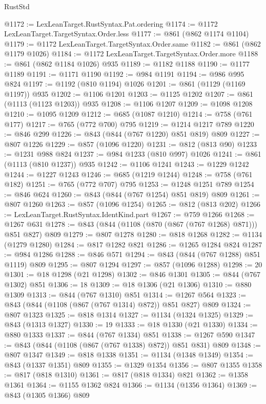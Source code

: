\begin{lexlean}{RustStd}
\begin{coremodule}
@1172 := LexLeanTarget.RustSyntax.Pat.ordering
@1174 := @1172 LexLeanTarget.TargetSyntax.Order.less
@1177 := @861 (@862 @1174 @1104)
@1179 := @1172 LexLeanTarget.TargetSyntax.Order.same
@1182 := @861 (@862 @1179 @1026)
@1184 := @1172 LexLeanTarget.TargetSyntax.Order.more
@1188 := @861 (@862 @1184 @1026) @935
@1189 := @1182 @1188
@1190 := @1177 @1189
@1191 := @1171 @1190
@1192 := @984 @1191
@1194 := @986 @995 @824
@1197 := @1192 (@810 @1194) @1026
@1201 := @861 (@1129 (@1169 @1197)) @935
@1202 := @1106 @1201
@1203 := @1125 @1202
@1207 := @861 (@1113 (@1123 @1203)) @935
@1208 := @1106 @1207
@1209 := @1098 @1208
@1210 := @1095 @1209
@1212 := @685 (@1087 @1210)
@1214 := @758 (@761 @177)
@1217 := @765 (@772 @700) @795
@1219 := @1214 @1217 @789
@1220 := @846 @299
@1226 := @843 (@844 (@767 @1220) @851 @819) @809
@1227 := @807 @1226
@1229 := @857 (@1096 @1220)
@1231 := @812 (@813 @90)
@1233 := @1231 @988 @824
@1237 := @984 @1233 (@810 @997) @1026
@1241 := @861 (@1113 (@810 @1237)) @935
@1242 := @1106 @1241
@1243 := @1229 @1242
@1244 := @1227 @1243
@1246 := @685 (@1219 @1244)
@1248 := @758 (@761 @182)
@1251 := @765 (@772 @707) @795
@1253 := @1248 @1251 @789
@1254 := @846 @624
@1260 := @843 (@844 (@767 @1254) @851 @819) @809
@1261 := @807 @1260
@1263 := @857 (@1096 @1254)
@1265 := @812 (@813 @202)
@1266 := LexLeanTarget.RustSyntax.IdentKind.part
@1267 := @759 @1266
@1268 := @1267 @631
@1278 := @843 (@844 (@1108 (@870 (@867 (@767 @1268) @871))) @851 @827) @809
@1279 := @807 @1278
@1280 := @818 @1268
@1282 := @1134 (@1279 @1280)
@1284 := @817 @1282 @821
@1286 := @1265 @1284 @824
@1287 := @984 @1286
@1288 := @846 @571
@1294 := @843 (@844 (@767 @1288) @851 @1119) @809
@1295 := @807 @1294
@1297 := @857 (@1096 @1288)
@1298 := 20
@1301 := @18 @1298 (@21 @1298)
@1302 := @846 @1301
@1305 := @844 (@767 @1302) @851
@1306 := 18
@1309 := @18 @1306 (@21 @1306)
@1310 := @880 @1309
@1313 := @844 (@767 @1310) @851
@1314 := @1267 @564
@1323 := @843 (@844 (@1108 (@867 (@767 @1314) @872)) @851 @827) @809
@1324 := @807 @1323
@1325 := @818 @1314
@1327 := @1134 (@1324 @1325)
@1329 := @843 (@1313 @1327)
@1330 := 19
@1333 := @18 @1330 (@21 @1330)
@1334 := @880 @1333
@1337 := @844 (@767 @1334) @851
@1338 := @1267 @590
@1347 := @843 (@844 (@1108 (@867 (@767 @1338) @872)) @851 @831) @809
@1348 := @807 @1347
@1349 := @818 @1338
@1351 := @1134 (@1348 @1349)
@1354 := @843 (@1337 @1351) @809
@1355 := @1329 @1354
@1356 := @807 @1355
@1358 := @817 (@818 @1310)
@1361 := @817 (@818 @1334) @821
@1362 := @1358 @1361
@1364 := @1155 @1362 @824
@1366 := @1134 (@1356 @1364)
@1369 := @843 (@1305 @1366) @809

\end{coremodule}
\end{lexlean}
